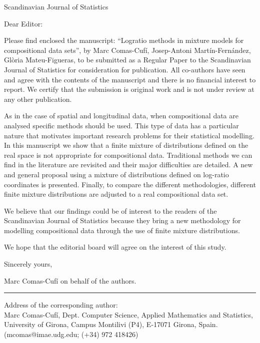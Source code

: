 \documentclass{letter}
\begin{document}
\begin{letter}{
Scandinavian Journal of Statistics}
\opening{Dear Editor:}

Please find enclosed the manuscript: “Logratio methods in mixture models for compositional data sets”, by Marc Comas-Cufí, Josep-Antoni Martín-Fernández, Glòria Mateu-Figueras, to be submitted as a Regular Paper to the Scandinavian Journal of Statistics for consideration for publication. All co-authors have seen and agree with the contents of the manuscript and there is no financial interest to report. We certify that the submission is original work and is not under review at any other publication.

As in the case of spatial and longitudinal data, when compositional data are analysed specific methods should be used. This type of data has a particular nature that motivates important research problems for their statistical modelling. In this manuscript we show that a finite mixture of distributions defined on the real space is not appropriate for compositional data. Traditional methods we can find in the literature are revisited and their major difficulties are detailed. A new and general proposal using a mixture of distributions defined on log-ratio coordinates is presented. Finally, to compare the different methodologies, different finite mixture distributions are adjusted to a real compositional data set.

We believe that our findings could be of interest to the readers of the Scandinavian Journal of Statistics because they bring a new methodology for modelling compositional data through the use of finite mixture distributions. 

We hope that the editorial board will agree on the interest of this study.

Sincerely yours,

\bigskip

Marc Comas-Cufí on behalf of the authors.

\noindent\rule{8cm}{0.4pt}

Address of the corresponding author: \\
Marc Comas-Cufí,
Dept. Computer Science, Applied Mathematics and Statistics, University of Girona, Campus Montilivi (P4), E-17071 Girona, Spain. (mcomas@imae.udg.edu; (+34) 972 418426)

\end{letter}
\end{document}

